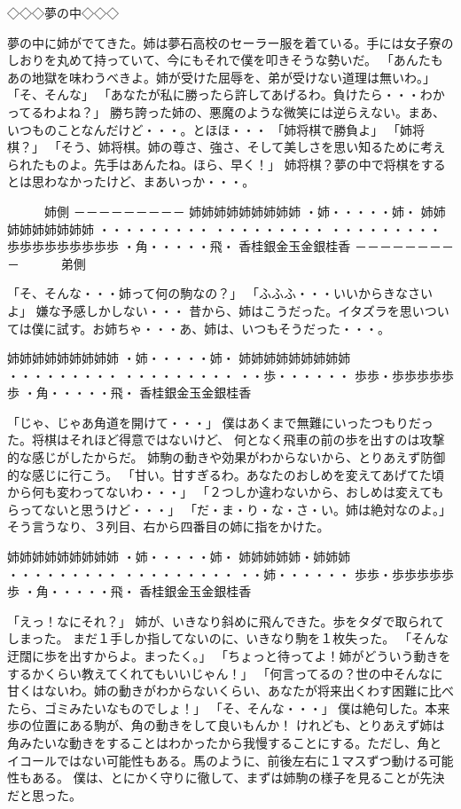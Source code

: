 ◇◇◇夢の中◇◇◇


夢の中に姉がでてきた。姉は夢石高校のセーラー服を着ている。手には女子寮のしおりを丸めて持っていて、今にもそれで僕を叩きそうな勢いだ。
「あんたもあの地獄を味わうべきよ。姉が受けた屈辱を、弟が受けない道理は無いわ。」
「そ、そんな」
「あなたが私に勝ったら許してあげるわ。負けたら・・・わかってるわよね？」
勝ち誇った姉の、悪魔のような微笑には逆らえない。まあ、いつものことなんだけど・・・。とほほ・・・
「姉将棋で勝負よ」
「姉将棋？」
「そう、姉将棋。姉の尊さ、強さ、そして美しさを思い知るために考えられたものよ。先手はあんたね。ほら、早く！」
姉将棋？夢の中で将棋をするとは思わなかったけど、まあいっか・・・。

　　　姉側
－－－－－－－－－
姉姉姉姉姉姉姉姉姉
・姉・・・・・姉・
姉姉姉姉姉姉姉姉姉
・・・・・・・・・
・・・・・・・・・
・・・・・・・・・
歩歩歩歩歩歩歩歩歩
・角・・・・・飛・
香桂銀金玉金銀桂香
－－－－－－－－－
　　　弟側

「そ、そんな・・・姉って何の駒なの？」
「ふふふ・・・いいからきなさいよ」
嫌な予感しかしない・・・
昔から、姉はこうだった。イタズラを思いついては僕に試す。お姉ちゃ・・・あ、姉は、いつもそうだった・・・。


姉姉姉姉姉姉姉姉姉
・姉・・・・・姉・
姉姉姉姉姉姉姉姉姉
・・・・・・・・・
・・・・・・・・・
・・歩・・・・・・
歩歩・歩歩歩歩歩歩
・角・・・・・飛・
香桂銀金玉金銀桂香

「じゃ、じゃあ角道を開けて・・・」
僕はあくまで無難にいったつもりだった。将棋はそれほど得意ではないけど、
何となく飛車の前の歩を出すのは攻撃的な感じがしたからだ。
姉駒の動きや効果がわからないから、とりあえず防御的な感じに行こう。
「甘い。甘すぎるわ。あなたのおしめを変えてあげてた頃から何も変わってないわ・・・」
「２つしか違わないから、おしめは変えてもらってないと思うけど・・・」
「だ・ま・り・な・さ・い。姉は絶対なのよ。」
そう言うなり、３列目、右から四番目の姉に指をかけた。

姉姉姉姉姉姉姉姉姉
・姉・・・・・姉・
姉姉姉姉姉・姉姉姉
・・・・・・・・・
・・・・・・・・・
・・姉・・・・・・
歩歩・歩歩歩歩歩歩
・角・・・・・飛・
香桂銀金玉金銀桂香


「えっ！なにそれ？」
姉が、いきなり斜めに飛んできた。歩をタダで取られてしまった。
まだ１手しか指してないのに、いきなり駒を１枚失った。
「そんな迂闊に歩を出すからよ。まったく。」
「ちょっと待ってよ！姉がどういう動きをするかくらい教えてくれてもいいじゃん！」
「何言ってるの？世の中そんなに甘くはないわ。姉の動きがわからないくらい、あなたが将来出くわす困難に比べたら、ゴミみたいなものでしょ！」
「そ、そんな・・・」
僕は絶句した。本来歩の位置にある駒が、角の動きをして良いもんか！
けれども、とりあえず姉は角みたいな動きをすることはわかったから我慢することにする。ただし、角とイコールではない可能性もある。馬のように、前後左右に１マスずつ動ける可能性もある。
僕は、とにかく守りに徹して、まずは姉駒の様子を見ることが先決だと思った。

